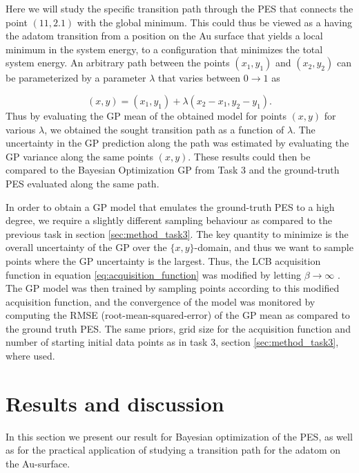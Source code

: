 \documentclass[11pt,a4paper]{article}
\begin{document}
Here we will study the specific transition path through the PES that connects the point $(11,2.1)$ with the global minimum. This could thus be viewed as a having the adatom transition from a position on the Au surface that yields a local minimum in the system energy, to a configuration that minimizes the total system energy. An arbitrary path between the points $(x_1,y_1)$ and $(x_2,y_2)$ can be parameterized by a parameter $\lambda$ that varies between $0\rightarrow1$ as

\begin{equation}
    (x,y) = \left(x_1, y_1 \right ) + \lambda \left(x_2-x_1, y_2-y_1 \right).
\end{equation}
Thus by evaluating the GP mean of the obtained model for points $(x,y)$ for various $\lambda$, we obtained the sought transition path as a function of $\lambda$. The uncertainty in the GP prediction along the path was estimated by evaluating the GP variance along the same points $(x,y)$. These results could then be compared to the Bayesian Optimization GP from Task 3 and the ground-truth PES evaluated along the same path. 

In order to obtain a GP model that emulates the ground-truth PES to a high degree, we require a slightly different sampling behaviour as compared to the previous task in section \ref{sec:method_task3}. The key quantity to minimize is the overall uncertainty of the GP over the $\{x,y\}$-domain, and thus we want to sample points where the GP uncertainty is the largest. Thus, the LCB acquisition function in equation \eqref{eq:acquisition_function} was modified by letting $\beta \rightarrow \infty$ \cite{project_pm}. The GP model was then trained by sampling points according to this modified acquisition function, and the convergence of the model was monitored by computing the RMSE (root-mean-squared-error) of the GP mean as compared to the ground truth PES. The same priors, grid size for the acquisition function and number of starting initial data points as in task 3, section \ref{sec:method_task3}, where used.

\section{Results and discussion}

In this section we present our result for Bayesian optimization of the PES, as well as for the practical application of studying a transition path for the adatom on the Au-surface.
\end{document}
